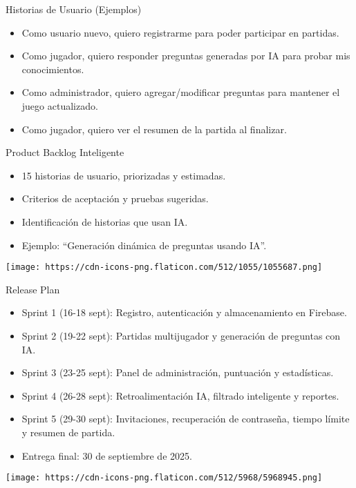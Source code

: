 \documentclass{beamer}
\begin{document}
\begin{frame}{Historias de Usuario (Ejemplos)}
  \begin{itemize}
    \item Como usuario nuevo, quiero registrarme para poder participar en partidas.
    \item Como jugador, quiero responder preguntas generadas por IA para probar mis conocimientos.
    \item Como administrador, quiero agregar/modificar preguntas para mantener el juego actualizado.
    \item Como jugador, quiero ver el resumen de la partida al finalizar.
  \end{itemize}
\end{frame}

\begin{frame}{Product Backlog Inteligente}
  \begin{itemize}
    \item 15 historias de usuario, priorizadas y estimadas.
    \item Criterios de aceptación y pruebas sugeridas.
    \item Identificación de historias que usan IA.
    \item Ejemplo: “Generación dinámica de preguntas usando IA”.
  \end{itemize}
  \texttt{[image: https://cdn-icons-png.flaticon.com/512/1055/1055687.png]}
\end{frame}

\begin{frame}{Release Plan}
  \begin{itemize}
    \item Sprint 1 (16-18 sept): Registro, autenticación y almacenamiento en Firebase.
    \item Sprint 2 (19-22 sept): Partidas multijugador y generación de preguntas con IA.
    \item Sprint 3 (23-25 sept): Panel de administración, puntuación y estadísticas.
    \item Sprint 4 (26-28 sept): Retroalimentación IA, filtrado inteligente y reportes.
    \item Sprint 5 (29-30 sept): Invitaciones, recuperación de contraseña, tiempo límite y resumen de partida.
    \item Entrega final: 30 de septiembre de 2025.
  \end{itemize}
  \texttt{[image: https://cdn-icons-png.flaticon.com/512/5968/5968945.png]}
\end{frame}
\end{document}
